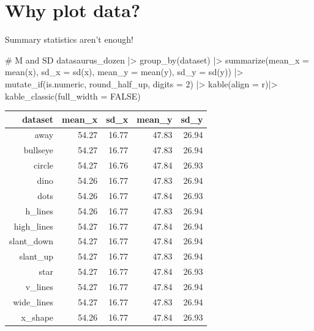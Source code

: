 \documentclass[
  letterpaper,
  DIV=11,
  numbers=noendperiod]{scrreprt}
\newenvironment{Shaded}{\begin{snugshade}}{\end{snugshade}}
\newcommand{\AttributeTok}[1]{\textcolor[rgb]{0.40,0.45,0.13}{#1}}
\newcommand{\CommentTok}[1]{\textcolor[rgb]{0.37,0.37,0.37}{#1}}
\newcommand{\ConstantTok}[1]{\textcolor[rgb]{0.56,0.35,0.01}{#1}}
\newcommand{\DecValTok}[1]{\textcolor[rgb]{0.68,0.00,0.00}{#1}}
\newcommand{\FunctionTok}[1]{\textcolor[rgb]{0.28,0.35,0.67}{#1}}
\newcommand{\NormalTok}[1]{\textcolor[rgb]{0.00,0.23,0.31}{#1}}
\newcommand{\SpecialCharTok}[1]{\textcolor[rgb]{0.37,0.37,0.37}{#1}}
\newcommand{\StringTok}[1]{\textcolor[rgb]{0.13,0.47,0.30}{#1}}
\begin{document}
\chapter{Why plot data?}\label{why-plot-data}

Summary statistics aren't enough!

\begin{Shaded}
\begin{Highlighting}[]
\CommentTok{\# M and SD}
\NormalTok{datasaurus\_dozen }\SpecialCharTok{|\textgreater{}}
  \FunctionTok{group\_by}\NormalTok{(dataset) }\SpecialCharTok{|\textgreater{}}
  \FunctionTok{summarize}\NormalTok{(}\AttributeTok{mean\_x =} \FunctionTok{mean}\NormalTok{(x),}
            \AttributeTok{sd\_x =} \FunctionTok{sd}\NormalTok{(x),}
            \AttributeTok{mean\_y =} \FunctionTok{mean}\NormalTok{(y),}
            \AttributeTok{sd\_y =} \FunctionTok{sd}\NormalTok{(y)) }\SpecialCharTok{|\textgreater{}}
  \FunctionTok{mutate\_if}\NormalTok{(is.numeric, round\_half\_up, }\AttributeTok{digits =} \DecValTok{2}\NormalTok{) }\SpecialCharTok{|\textgreater{}}
  \FunctionTok{kable}\NormalTok{(}\AttributeTok{align =} \StringTok{\textquotesingle{}r\textquotesingle{}}\NormalTok{)}\SpecialCharTok{|\textgreater{}}
  \FunctionTok{kable\_classic}\NormalTok{(}\AttributeTok{full\_width =} \ConstantTok{FALSE}\NormalTok{)}
\end{Highlighting}
\end{Shaded}

\begin{longtable*}[t]{rrrrr}
\toprule
dataset & mean\_x & sd\_x & mean\_y & sd\_y\\
\midrule
away & 54.27 & 16.77 & 47.83 & 26.94\\
bullseye & 54.27 & 16.77 & 47.83 & 26.94\\
circle & 54.27 & 16.76 & 47.84 & 26.93\\
dino & 54.26 & 16.77 & 47.83 & 26.94\\
dots & 54.26 & 16.77 & 47.84 & 26.93\\
\addlinespace
h\_lines & 54.26 & 16.77 & 47.83 & 26.94\\
high\_lines & 54.27 & 16.77 & 47.84 & 26.94\\
slant\_down & 54.27 & 16.77 & 47.84 & 26.94\\
slant\_up & 54.27 & 16.77 & 47.83 & 26.94\\
star & 54.27 & 16.77 & 47.84 & 26.93\\
\addlinespace
v\_lines & 54.27 & 16.77 & 47.84 & 26.94\\
wide\_lines & 54.27 & 16.77 & 47.83 & 26.94\\
x\_shape & 54.26 & 16.77 & 47.84 & 26.93\\
\bottomrule
\end{longtable*}
\end{document}
